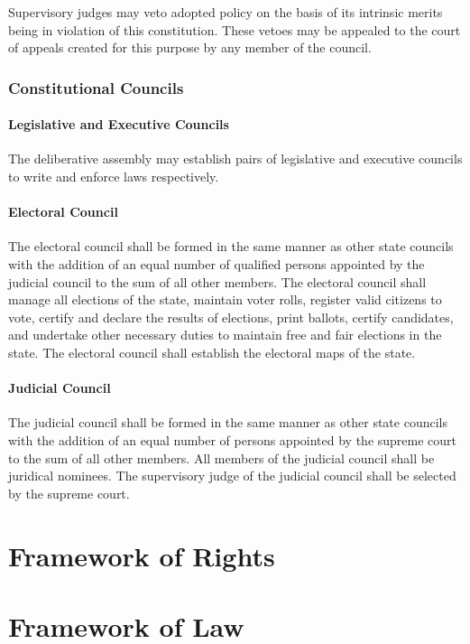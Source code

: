 \documentclass{article}
\begin{document}
Supervisory judges may veto adopted policy on the basis of its intrinsic merits being in violation of this constitution. These vetoes may be appealed to the court of appeals created for this purpose by any member of the council.
\subsubsection{Constitutional Councils}
\paragraph{Legislative and Executive Councils}
The deliberative assembly may establish pairs of legislative and executive councils to write and enforce laws respectively. 
\paragraph{Electoral Council}
The electoral council shall be formed in the same manner as other state councils with the addition of an equal number of qualified persons appointed by the judicial council to the sum of all other members. The electoral council shall manage all elections of the state, maintain voter rolls, register valid citizens to vote, certify and declare the results of elections, print ballots, certify candidates, and undertake other necessary duties to maintain free and fair elections in the state. The electoral council shall establish the electoral maps of the state.
\paragraph{Judicial Council}
The judicial council shall be formed in the same manner as other state councils with the addition of an equal number of persons appointed by the supreme court to the sum of all other members. All members of the judicial council shall be juridical nominees. The supervisory judge of the judicial council shall be selected by the supreme court.
\section{Framework of Rights}
\section{Framework of Law}
\end{document}
